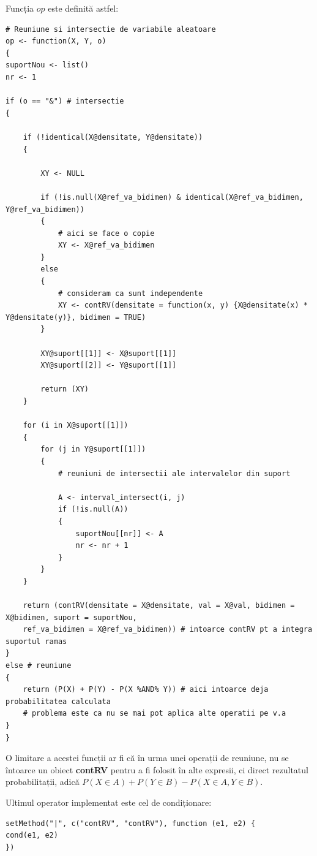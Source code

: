 \documentclass[12pt]{article}
\begin{document}
Funcția $op$ este definită astfel:
\begin{lstlisting}
# Reuniune si intersectie de variabile aleatoare
op <- function(X, Y, o)
{	
suportNou <- list()
nr <- 1

if (o == "&") # intersectie
{
	
	if (!identical(X@densitate, Y@densitate))
	{
		
		XY <- NULL
		
		if (!is.null(X@ref_va_bidimen) & identical(X@ref_va_bidimen, Y@ref_va_bidimen))
		{
			# aici se face o copie
			XY <- X@ref_va_bidimen
		}
		else
		{
			# consideram ca sunt independente
			XY <- contRV(densitate = function(x, y) {X@densitate(x) * Y@densitate(y)}, bidimen = TRUE)
		}
		
		XY@suport[[1]] <- X@suport[[1]]
		XY@suport[[2]] <- Y@suport[[1]]
		
		return (XY)
	}
	
	for (i in X@suport[[1]])
	{
		for (j in Y@suport[[1]])
		{
			# reuniuni de intersectii ale intervalelor din suport
			
			A <- interval_intersect(i, j)
			if (!is.null(A))
			{
				suportNou[[nr]] <- A
				nr <- nr + 1
			}
		}
	}
	
	return (contRV(densitate = X@densitate, val = X@val, bidimen = X@bidimen, suport = suportNou,
	ref_va_bidimen = X@ref_va_bidimen)) # intoarce contRV pt a integra suportul ramas
}
else # reuniune
{
	return (P(X) + P(Y) - P(X %AND% Y)) # aici intoarce deja probabilitatea calculata
	# problema este ca nu se mai pot aplica alte operatii pe v.a
}
}
\end{lstlisting}\par
O limitare a acestei funcții ar fi că în urma unei operații de reuniune, nu se întoarce un obiect \textbf{contRV} pentru a fi folosit în alte expresii, ci direct rezultatul probabilitații, adică $P(X \in A) + P(Y \in B) - P(X \in A, Y \in B)$.\vspace*{2\baselineskip}\par

Ultimul operator implementat este cel de condiționare:
\begin{lstlisting}[numbers=none]
setMethod("|", c("contRV", "contRV"), function (e1, e2) {
cond(e1, e2)
})
\end{lstlisting}
\end{document}

